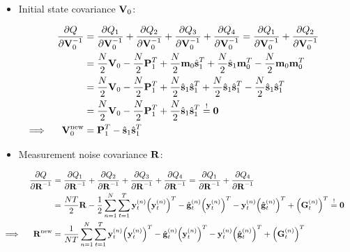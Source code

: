 	\begin{itemize}
		\item Initial state covariance \(\mat{V}_0\):
	\end{itemize}
	\begin{align}
		&&\pdv{Q}{\mat{V}_0^{-1}}
			&= \pdv{Q_1}{\mat{V}_0^{-1}} + \pdv{Q_2}{\mat{V}_0^{-1}} + \pdv{Q_3}{\mat{V}_0^{-1}} + \pdv{Q_4}{\mat{V}_0^{-1}} = \pdv{Q_1}{\mat{V}_0^{-1}} + \pdv{Q_2}{\mat{V}_0^{-1}} & \nonumber \\
		&&	&= \frac{N}{2} \mat{V}_0 - \frac{N}{2} \mat{P}_1^T + \frac{N}{2} \vec{m}_0 \hat{\vec{s}}_1^T + \frac{N}{2} \hat{\vec{s}}_1 \vec{m}_0^T - \frac{N}{2} \vec{m}_0 \vec{m}_0^T & \nonumber \\
		&&	&= \frac{N}{2} \mat{V}_0 - \frac{N}{2} \mat{P}_1^T + \frac{N}{2} \hat{\vec{s}}_1 \hat{\vec{s}}_1^T + \frac{N}{2} \hat{\vec{s}}_1 \hat{\vec{s}}_1^T - \frac{N}{2} \hat{\vec{s}}_1 \hat{\vec{s}}_1^T & \nonumber \\
		&&	&= \frac{N}{2} \mat{V}_0 - \frac{N}{2} \mat{P}_1^T + \frac{N}{2} \hat{\vec{s}}_1 \hat{\vec{s}}_1^T \overset{!}{=} \mat{0} & \nonumber \\
		\implies && \mat{V}_0^\new &= \mat{P}_1^T - \hat{\vec{s}}_1 \hat{\vec{s}}_1^T & \label{eq:initialStateCovariance}
	\end{align}
	
	\begin{itemize}
		\item Measurement noise covariance \(\mat{R}\):
	\end{itemize}
	\begin{align}
		&&\pdv{Q}{\mat{R}^{-1}}
			&= \pdv{Q_1}{\mat{R}^{-1}} + \pdv{Q_2}{\mat{R}^{-1}} + \pdv{Q_3}{\mat{R}^{-1}} + \pdv{Q_4}{\mat{R}^{-1}} = \pdv{Q_1}{\mat{R}^{-1}} + \pdv{Q_4}{\mat{R}^{-1}} & \nonumber \\
		&&	&= \frac{NT}{2} \mat{R} - \frac{1}{2} \sum_{n = 1}^{N} \sum_{t = 1}^{T} \vec{y}_t^{(n)} \Big(\vec{y}_t^{(n)}\Big)^T - \hat{\vec{g}}_t^{(n)} \Big(\vec{y}_t^{(n)}\Big)^T - \vec{y}_t^{(n)} \Big(\hat{\vec{g}}_t^{(n)}\Big)^T + \Big(\mat{G}_t^{(n)}\Big)^T \overset{!}{=} \mat{0} & \nonumber \\
		\implies && \mat{R}^\new &= \frac{1}{NT} \sum_{n = 1}^{N} \sum_{t = 1}^{T} \vec{y}_t^{(n)} \Big(\vec{y}_t^{(n)}\Big)^T - \hat{\vec{g}}_t^{(n)} \Big(\vec{y}_t^{(n)}\Big)^T - \vec{y}_t^{(n)} \Big(\hat{\vec{g}}_t^{(n)}\Big)^T + \Big(\mat{G}_t^{(n)}\Big)^T & \label{eq:measurementNoiseCovariance}
	\end{align}
	
